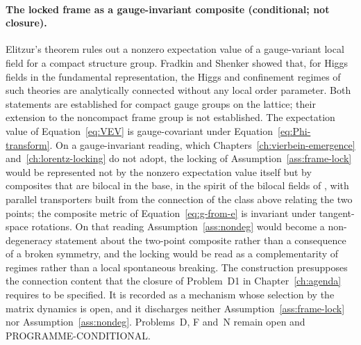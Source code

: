 \paragraph{The locked frame as a gauge-invariant composite (conditional; not closure).}
Elitzur's theorem \cite{Elitzur1975} rules out a nonzero expectation value of a gauge-variant local field for a compact structure group. Fradkin and Shenker \cite{FradkinShenker1979} showed that, for Higgs fields in the fundamental representation, the Higgs and confinement regimes of such theories are analytically connected without any local order parameter. Both statements are established for compact gauge groups on the lattice; their extension to the noncompact frame group is not established. The expectation value of Equation~\eqref{eq:VEV} is gauge-covariant under Equation~\eqref{eq:Phi-transform}. On a gauge-invariant reading, which Chapters~\ref{ch:vierbein-emergence} and~\ref{ch:lorentz-locking} do not adopt, the locking of Assumption~\ref{ass:frame-lock} would be represented not by the nonzero expectation value itself but by composites that are bilocal in the base, in the spirit of the bilocal fields of \cite{HoKawaiSteinacker2025}, with parallel transporters built from the connection of the class above relating the two points; the composite metric of Equation~\eqref{eq:g-from-e} is invariant under tangent-space rotations. On that reading Assumption~\ref{ass:nondeg} would become a non-degeneracy statement about the two-point composite rather than a consequence of a broken symmetry, and the locking would be read as a complementarity of regimes rather than a local spontaneous breaking. The construction presupposes the connection content that the closure of Problem~D1 in Chapter~\ref{ch:agenda} requires to be specified. It is recorded as a mechanism whose selection by the matrix dynamics is open, and it discharges neither Assumption~\ref{ass:frame-lock} nor Assumption~\ref{ass:nondeg}. Problems~D, F and~N remain open and PROGRAMME-CONDITIONAL.
